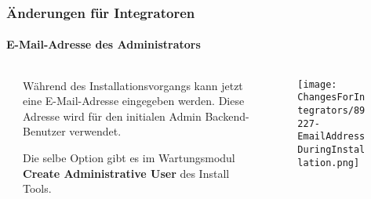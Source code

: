 \begin{frame}[fragile]
	\frametitle{Änderungen für Integratoren}
	\framesubtitle{E-Mail-Adresse des Administrators}

	\begin{columns}[T]
		\begin{column}{.04\textwidth}
		\end{column}
		\begin{column}{.38\textwidth}

			Während des Installationsvorgangs kann jetzt eine E-Mail-Adresse eingegeben werden.
			Diese Adresse wird für den initialen Admin Backend-Benutzer verwendet.

			\vspace{0.2cm}

			Die selbe Option gibt es im Wartungsmodul
			\textbf{Create Administrative User} des Install Tools.

		\end{column}
		\begin{column}{.58\textwidth}
			\vspace{-0.3cm}
			\begin{figure}
				\texttt{[image: ChangesForIntegrators/89227-EmailAddressDuringInstallation.png]}
			\end{figure}
		\end{column}
	\end{columns}

\end{frame}



